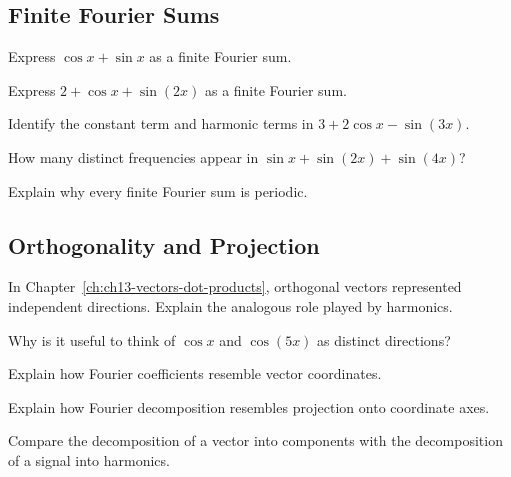 \subsection*{Finite Fourier Sums}
\begin{exercise}
Express $\cos x + \sin x$ as a finite Fourier sum.
\end{exercise}
\begin{exercise}
Express $2+\cos x+\sin(2x)$ as a finite Fourier sum.
\end{exercise}
\begin{exercise}
Identify the constant term and harmonic terms in $3+2\cos x-\sin(3x)$.
\end{exercise}
\begin{exercise}
How many distinct frequencies appear in $\sin x+\sin(2x)+\sin(4x)$?
\end{exercise}
\begin{exercise}
Explain why every finite Fourier sum is periodic.
\end{exercise}

\subsection*{Orthogonality and Projection}
\begin{exercise}
In Chapter~\ref{ch:ch13-vectors-dot-products}, orthogonal vectors
represented independent directions. Explain the analogous role played
by harmonics.
\end{exercise}
\begin{exercise}
Why is it useful to think of $\cos x$ and $\cos(5x)$ as distinct
directions?
\end{exercise}
\begin{exercise}
Explain how Fourier coefficients resemble vector coordinates.
\end{exercise}
\begin{exercise}
Explain how Fourier decomposition resembles projection onto coordinate
axes.
\end{exercise}
\begin{exercise}
Compare the decomposition of a vector into components with the
decomposition of a signal into harmonics.
\end{exercise}

